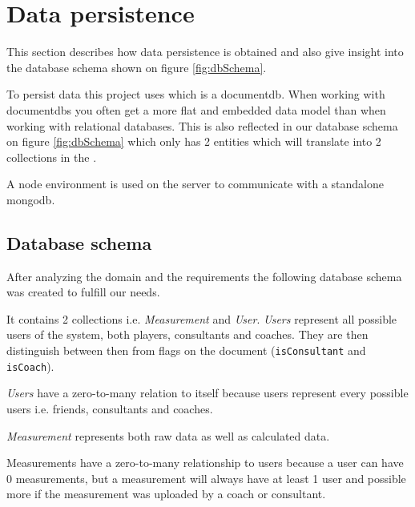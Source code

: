 \section{Data persistence}
This section describes how data persistence is obtained and also give insight into the database schema shown on figure \ref{fig:dbSchema}.

To persist data this project uses  which is a \gls{documentdb}.
When working with \glspl{documentdb} you often get a more flat and embedded data model than when working with relational databases. 
This is also reflected in our database schema on figure \ref{fig:dbSchema} which only has 2 entities which will translate into 2 collections in the .

A \gls{node} environment is used on the server to communicate with a standalone \gls{mongodb}.

\subsection{Database schema}
After analyzing the domain and the requirements the following database schema was created to fulfill our needs.

It contains 2 collections i.e. \textit{Measurement} and \textit{User}. \textit{Users} represent all possible users of the system, both players, consultants and coaches. 
They are then distinguish between then from flags on the document (\verb+isConsultant+ and \verb+isCoach+).

\textit{Users} have a zero-to-many relation to itself because users represent every possible users i.e. friends, consultants and coaches.

\textit{Measurement} represents both raw data as well as calculated data.

Measurements have a zero-to-many relationship to users because a user can have 0 measurements, but a measurement will always have at least 1 user and possible more if the measurement was uploaded by a coach or consultant.

